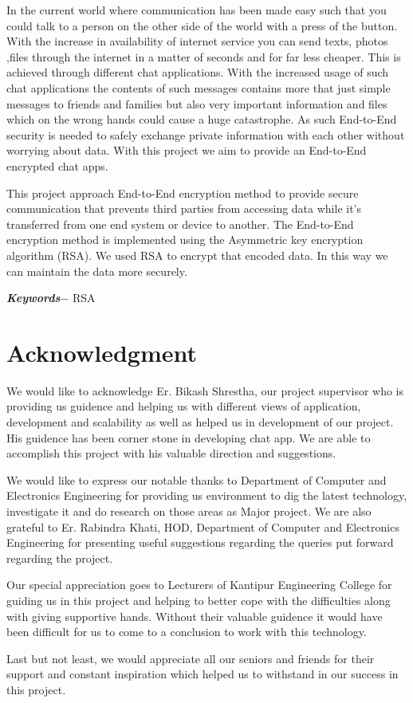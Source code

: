 In the current world where communication has been made easy such that you could talk to a person on the other side of the world with a press of the button. With the increase in availability of internet service you can send texts, photos ,files through the internet in a matter of seconds and for far less cheaper. This is achieved through different chat applications. With the increased usage of such chat applications the contents of such messages contains more that just simple messages to friends and families but also very important information and files which on the wrong hands could cause a huge catastrophe. As such End-to-End security is needed to safely exchange private information with each other without worrying about data. With this project we aim to provide an End-to-End encrypted chat apps.

This project approach End-to-End encryption method to provide  secure communication that prevents third parties from accessing data while it's transferred from one end system or device to another.
The End-to-End encryption method is implemented using the Asymmetric key encryption algorithm (RSA). We used RSA to encrypt that encoded data.
In this way we can maintain the data more securely.


\par
\textbf{\textit{Keywords$-$}} RSA

\chapter*{Acknowledgment}
We would like to acknowledge Er. Bikash Shrestha, our project supervisor who is providing us guidence and
helping us with different views of application, development and scalability as well as helped us in development of our project.
His guidence has been corner stone in developing chat app. We are able to accomplish this project with his valuable direction and suggestions.\par
We would like to express our notable thanks to Department of Computer and Electronics Engineering
for providing us environment to dig the latest technology, investigate it and do research on those areas as Major project.
We are also grateful to Er. Rabindra Khati, HOD, Department of Computer and Electronics Engineering
for presenting useful suggestions regarding the queries put forward regarding the project.\par
Our special appreciation goes to Lecturers of Kantipur Engineering College for guiding us in this project
and helping to better cope with the difficulties along with giving supportive hands. Without their
valuable guidence it would have been difficult for us to come to a conclusion to work with this technology.\par
Last but not least, we would appreciate all our seniors and friends for their support and constant inspiration which helped us to
withstand in our success in this project.
\begin{flushright}
	\vskip -20pt
	\submittedBy
\end{flushright}



